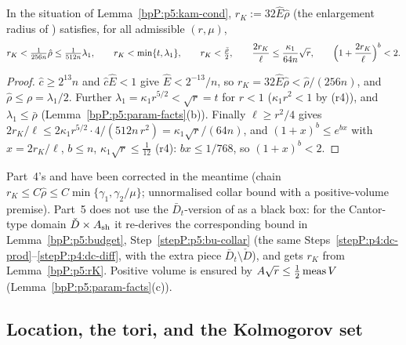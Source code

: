 \begin{lemma}\label{bpP:p5:rK}
In the situation of Lemma~\ref{bpP:p5:kam-cond}, $r_K:=32\hat E\hat\rho$ (the enlargement radius of ) satisfies, for all admissible $(r,\mu)$,
\[r_K<\tfrac{1}{256n}\hat\rho\le\tfrac1{512n}\lambda_1,\qquad r_K<\min\{t,\lambda_1\},\qquad r_K<\tfrac{\bar\rho}2,\qquad\frac{2r_K}{\ell}\le\frac{\kappa_1}{64n}\sqrt r,\qquad\Bigl(1+\frac{2r_K}\ell\Bigr)^b<2.\]
\end{lemma}
\begin{proof}
\label{stepP:p5:rk-dir} $\hat c\ge2^{13}n$ and $\hat c\hat E<1$ give $\hat E<2^{-13}/n$, so $r_K=32\hat E\hat\rho<\hat\rho/(256n)$, and $\hat\rho\le\rho=\lambda_1/2$. Further $\lambda_1=\kappa_1r^{5/2}<\sqrt r=t$ for $r<1$ ($\kappa_1r^2<1$ by (r4)), and $\lambda_1\le\bar\rho$ (Lemma~\ref{bpP:p5:param-facts}(b)). Finally $\ell\ge r^2/4$ gives $2r_K/\ell\le2\kappa_1r^{5/2}\cdot4/(512n\,r^2)=\kappa_1\sqrt r/(64n)$, and $(1+x)^b\le e^{bx}$ with $x=2r_K/\ell$, $b\le n$, $\kappa_1\sqrt r\le\frac1{12}$ (r4): $bx\le1/768$, so $(1+x)^b<2$.
\end{proof}
\begin{remark}\label{bpP:p5:use5-fix}
Part~4's  and  have been corrected in the meantime (chain $r_K\le C\hat\rho\le C\min\{\gamma_1,\gamma_2/\mu\}$; unnormalised collar bound with a positive-volume premise). Part~5 does not use the $\bar D_t$-version of  as a black box: for the Cantor-type domain $\check D\times A_{\rm sh}$ it re-derives the corresponding bound in Lemma~\ref{bpP:p5:budget}, Step~\ref{stepP:p5:bu-collar} (the same Steps~\ref{stepP:p4:dc-prod}--\ref{stepP:p4:dc-diff}, with the extra piece $\bar D_t\setminus\check D$), and gets $r_K$ from Lemma~\ref{bpP:p5:rK}. Positive volume is ensured by $A\sqrt r\le\frac12\operatorname{meas} V$ (Lemma~\ref{bpP:p5:param-facts}(c)).
\end{remark}

\subsection{Location, the tori, and the Kolmogorov set}\label{bpP:p5:tori}

